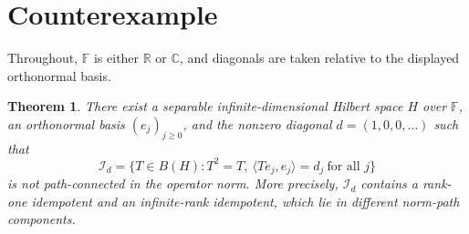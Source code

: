\documentclass[11pt]{article}
\newtheorem{theorem}{Theorem}
\newcommand{\F}{\mathbb F}
\begin{document}
\section*{Counterexample}

Throughout, $\F$ is either $\mathbb R$ or $\mathbb C$, and diagonals are
taken relative to the displayed orthonormal basis.

\begin{theorem}
There exist a separable infinite-dimensional Hilbert space $H$ over $\F$, an
orthonormal basis $(e_j)_{j\ge0}$, and the nonzero diagonal
$d=(1,0,0,\ldots)$ such that
\[
 \mathcal I_d=\{T\in B(H):T^2=T,\ 
       \langle Te_j,e_j\rangle=d_j\ \text{for all }j\}
\]
is not path-connected in the operator norm.  More precisely, $\mathcal I_d$
contains a rank-one idempotent and an infinite-rank idempotent, which lie in
different norm-path components.
\end{theorem}
\end{document}
